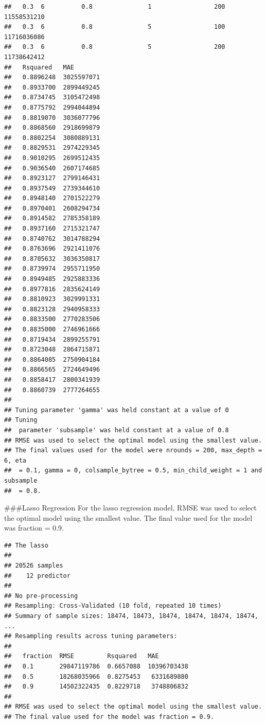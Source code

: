\documentclass[11pt,]{article}
\newenvironment{Shaded}{\begin{snugshade}}{\end{snugshade}}
\newcommand{\KeywordTok}[1]{\textcolor[rgb]{0.13,0.29,0.53}{\textbf{#1}}}
\newcommand{\NormalTok}[1]{#1}
\newcommand{\OperatorTok}[1]{\textcolor[rgb]{0.81,0.36,0.00}{\textbf{#1}}}
\newcommand{\StringTok}[1]{\textcolor[rgb]{0.31,0.60,0.02}{#1}}
\begin{document}
\begin{verbatim}
##   0.3  6          0.8               1                 200      11558531210
##   0.3  6          0.8               5                 100      11716036086
##   0.3  6          0.8               5                 200      11738642412
##   Rsquared   MAE       
##   0.8896248  3025597071
##   0.8933700  2899449245
##   0.8734745  3105472498
##   0.8775792  2994044894
##   0.8819070  3036077796
##   0.8868560  2918699879
##   0.8802254  3080889131
##   0.8829531  2974229345
##   0.9010295  2699512435
##   0.9036540  2607174685
##   0.8923127  2799146431
##   0.8937549  2739344610
##   0.8948140  2701522279
##   0.8970401  2608294734
##   0.8914582  2785358189
##   0.8937160  2715321747
##   0.8740762  3014788294
##   0.8763696  2921411076
##   0.8705632  3036350817
##   0.8739974  2955711950
##   0.8949485  2925883336
##   0.8977816  2835624149
##   0.8810923  3029991331
##   0.8823128  2940958333
##   0.8833500  2770283506
##   0.8835000  2746961666
##   0.8719434  2899255791
##   0.8723048  2864715871
##   0.8864085  2750904184
##   0.8866565  2724649496
##   0.8858417  2800341939
##   0.8860739  2777264655
## 
## Tuning parameter 'gamma' was held constant at a value of 0
## Tuning
##  parameter 'subsample' was held constant at a value of 0.8
## RMSE was used to select the optimal model using the smallest value.
## The final values used for the model were nrounds = 200, max_depth = 6, eta
##  = 0.1, gamma = 0, colsample_bytree = 0.5, min_child_weight = 1 and subsample
##  = 0.8.
\end{verbatim}

\#\#\#Lasso Regression For the lasso regression model, RMSE was used to
select the optimal model using the smallest value. The final value used
for the model was fraction = 0.9.

\begin{Shaded}
\end{Shaded}

\begin{verbatim}
## The lasso 
## 
## 20526 samples
##    12 predictor
## 
## No pre-processing
## Resampling: Cross-Validated (10 fold, repeated 10 times) 
## Summary of sample sizes: 18474, 18473, 18474, 18474, 18474, 18474, ... 
## Resampling results across tuning parameters:
## 
##   fraction  RMSE         Rsquared   MAE        
##   0.1       29847119786  0.6657088  10396703438
##   0.5       18268035966  0.8275453   6331689880
##   0.9       14502322435  0.8229718   3748806832
## 
## RMSE was used to select the optimal model using the smallest value.
## The final value used for the model was fraction = 0.9.
\end{verbatim}
\end{document}
